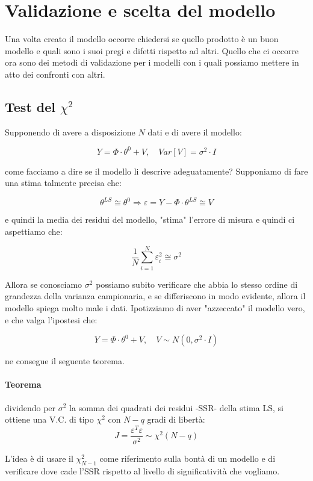 \section{Validazione e scelta del modello}
Una volta creato il modello occorre chiedersi se quello prodotto è un buon modello e quali sono i suoi pregi e difetti rispetto ad altri. Quello che ci occorre ora sono dei metodi di validazione per i modelli con i quali possiamo mettere in atto dei confronti con altri. 
\subsection{Test del $\chi^2$}
Supponendo di avere a disposizione $N$ dati e di avere il modello:

    \[ Y=\Phi\cdot\theta^0+V, \quad Var[V]=\sigma^2\cdot I \]

come facciamo a dire se il modello li descrive adeguatamente? Supponiamo di fare una stima talmente precisa che:

    \[ \theta^{LS}\cong\theta^0 \Longrightarrow \varepsilon =Y-\Phi\cdot\theta^{LS}\cong V \]

e quindi la media dei residui del modello, "stima" l'errore di misura e quindi ci aspettiamo che:

    \[ \frac{1}{N}\sum_{i=1}^{N}{\varepsilon_i^2}\cong\sigma^2 \]

Allora se conosciamo $\sigma^2$ possiamo subito verificare che abbia lo stesso ordine di grandezza della varianza campionaria, e se differiscono in modo evidente, allora il modello spiega molto male i dati.
Ipotizziamo di aver "azzeccato" il modello vero, e che valga l'ipostesi che:

    \[ Y=\Phi\cdot\theta^0+V,  \quad  V\sim N(0,\sigma^2\cdot I) \]

ne consegue il seguente teorema.
\paragraph{Teorema} dividendo per $\sigma^2$ la somma dei quadrati dei residui -SSR- della stima LS, si ottiene una V.C. di tipo $\chi^2$ con $N-q$ gradi di libertà:
  \[ J=\frac{\varepsilon^T\varepsilon}{\sigma^2}\sim \chi^2(N-q) \]


L'idea è di usare il $\chi_{N-1}^2$ come riferimento sulla bontà di un modello e di verificare dove cade l'SSR rispetto al livello di significatività che vogliamo. 

